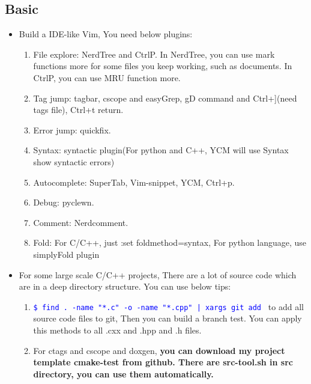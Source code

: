 \documentclass[paper=8.5in:11in, twoside, 12pt, pagesize=pdftex]{book}
\newcommand{\linuxcommand}[1]{\texttt{\textcolor{blue}{\$ #1 \Pisymbol{psy}{191}}}}
\begin{document}
				\subsection{Basic}
				\begin{itemize}
					\item Build a IDE-like Vim, You need below plugins:
					\begin{enumerate}
						\item File explore: NerdTree and CtrlP. In NerdTree, you can use mark functions more for some files you keep working, such as documents. In CtrlP, you can use MRU function more. 
						
						\item Tag jump: tagbar, cscope and easyGrep, gD command and Ctrl+](need tags file), Ctrl+t return.
						
						\item Error jump: quickfix.
						
						\item Syntax: syntactic plugin(For python and C++, YCM will use Syntax show syntactic errors)
						
						\item Autocomplete: SuperTab, Vim-snippet, YCM, Ctrl+p.
						
						\item Debug: pyclewn.
						
						\item Comment: Nerdcomment.
						
						\item Fold: For C/C++, just :set foldmethod=syntax, For python language, use simplyFold plugin 
					\end{enumerate}
					
					\item For some large scale C/C++ projects, There are a lot of source code which are in a deep directory structure. You can use below tips:
					
					\begin{enumerate}
						\item \linuxcommand{find . -name "*.c" -o -name "*.cpp" | xargs git add} to add all source code files to git, Then you can build a branch test. You can apply this methods to all .cxx and .hpp and .h files. 
						
						\item For ctags and cscope and doxgen, \textbf{you can download my project template cmake-test from github. There are src-tool.sh in src directory, you can use them automatically.}
						

\end{enumerate}
\end{itemize}
\end{document}
